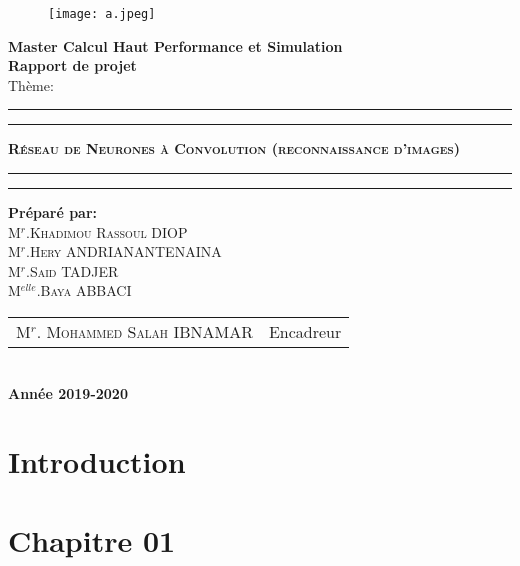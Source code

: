 \documentclass[a4paper,11pt]{report}
\begin{document}
\begin{center}
\begin{figure}[!htbp]
\begin{center}
\texttt{[image: a.jpeg]}
\end{center}
\end{figure}


{\Large {\bf { Master Calcul Haut Performance et Simulation }}}\\
 \textbf{\Huge { Rapport de projet}} \\
{\huge {Thème:}}\\
\hrule
\hrule
{}
{\huge \textbf{\textsc{ Réseau de Neurones à Convolution (reconnaissance d’images) }}}\\
\hrule
\hrule
{}
{\textbf{\Large{Préparé par:}}}\\
{\large\textsc{M$^{r}$.Khadimou Rassoul DIOP}}\\
{\large\textsc{M$^{r}$.Hery ANDRIANANTENAINA}}\\
{\large\textsc{M$^{r}$.Said TADJER }}\\
{\large\textsc{M$^{elle}$.Baya ABBACI}}\\
{\large
\begin{tabular}{ll}
M$^{r}$. \textsc{Mohammed Salah} IBNAMAR  & Encadreur    \\
\end{tabular}
}\\
{\Large\textbf{ Année 2019-2020}}
\end{center}


\tableofcontents


\chapter*{Introduction}


\chapter{Chapitre 01}
\end{document}
